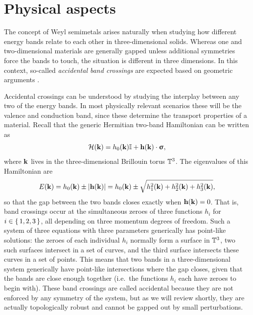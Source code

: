 \section{Physical aspects}\label{sec:semimetal-physics}

The concept of Weyl semimetals arises naturally when studying how different energy bands relate to each other in three-dimensional solids. Whereas one and two-dimensional materials are generally gapped unless additional symmetries force the bands to touch, the situation is different in three dimensions. In this context, so-called \emph{accidental band crossings} are expected based on geometric arguments \cite{Herring_Accidental}.

Accidental crossings can be understood by studying the interplay between any two of the energy bands. In most physically relevant scenarios these will be the valence and conduction band, since these determine the transport properties of a material. Recall that the generic Hermitian two-band Hamiltonian can be written as
\begin{equation*}
	\Hc(\k) = h_0(\k)\Id + \h(\k)\cdot\bm{\upsigma}, %
\end{equation*}
where $\vb{k}$ lives in the three-dimensional Brillouin torus $\mathbb{T}^3$. The eigenvalues of this Hamiltonian are
\begin{equation*}
	E(\vb{k}) = h_0(\vb{k}) \pm \abs{\vb{h}(\vb{k})} = h_0(\vb{k}) \pm \sqrt{h_1^2(\vb{k}) + h_2^2(\vb{k}) + h_3^2(\vb{k})},
\end{equation*}
so that the gap between the two bands closes exactly when $\vb{h}(\vb{k}) = 0$. That is, band crossings occur at the simultaneous zeroes of three functions $h_i$ for $i\in\set{1,2,3}$, all depending on three momentum degrees of freedom. Such a system of three equations with three parameters generically has point-like solutions: the zeroes of each individual $h_i$ normally form a surface in $\mathbb{T}^3$, two such surfaces intersect in a set of curves, and the third surface intersects these curves in a set of points. This means that two bands in a three-dimensional system generically have point-like intersections where the gap closes, given that the bands are close enough together (i.e.\ the functions $h_i$ each have zeroes to begin with). %
These band crossings are called accidental because they are not enforced by any symmetry of the system, but as we will review shortly, they are actually topologically robust and cannot be gapped out by small perturbations.

